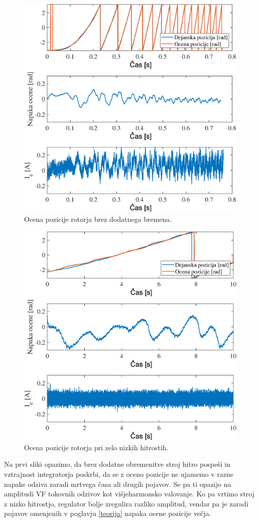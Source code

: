 \documentclass[a4paper,twoside,openright,12pt,slovene]{book}
\begin{document}
\begin{figure}[!htbp]
    \centering
    \includegraphics[width=0.8\columnwidth]{Slike/NoLoadRun.eps}
    \caption{\label{NoLoadRun} Ocena pozicije rotorja brez dodatnega bremena. }
\end{figure}

\begin{figure}[!htbp]
    \centering
    \includegraphics[width=0.8\columnwidth]{Slike/HighLoadRun.eps}
    \caption{\label{HighLoadRun} Ocena pozicije rotorja pri zelo nizkih hitrostih. }
\end{figure}

Na prvi sliki opazimo, da brez dodatne obremenitve stroj hitro pospeši in vztrajnost integratorja poskrbi, da se z oceno pozicije ne ujamemo v razne napake odziva zaradi mrtvega časa ali drugih
pojavov. Se pa ti opazijo na amplitudi VF tokovnih odzivov kot višjeharmonsko valovanje. Ko pa vrtimo stroj z nizko hitrostjo, regulator bolje zregulira razliko amplitud, vendar pa je zaradi pojavov
omenjenih v poglavju \ref{teorija} napaka ocene pozicije večja.
\end{document}
